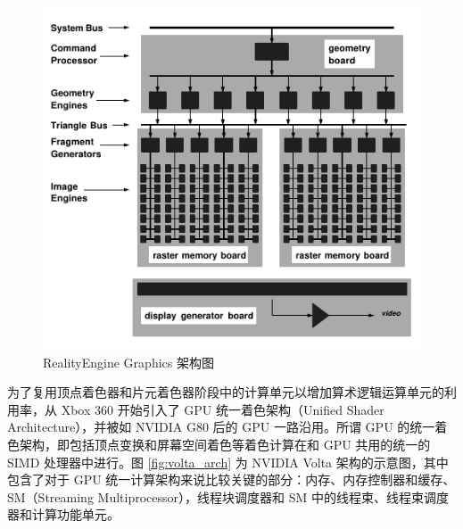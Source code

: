 \begin{figure}
    \centering
    \includegraphics[width=1.0\linewidth]{figures/RealityGraphics-Page2-Crop.pdf}
    \caption{RealityEngine Graphics 架构图\cite{RealityEngineSGI}}
    \label{fig:reality_engine_graphics}
\end{figure}

为了复用顶点着色器和片元着色器阶段中的计算单元以增加算术逻辑运算单元的利用率，从 Xbox 360 \cite{1624324}开始引入了 GPU 统一着色架构（Unified Shader Architecture），并被如 NVIDIA G80 \cite{4523358}后的 GPU 一路沿用。所谓 GPU 的统一着色架构，即包括顶点变换和屏幕空间着色等着色计算在和 GPU 共用的统一的 SIMD 处理器中进行。图 \ref{fig:volta_arch} 为 NVIDIA Volta 架构的示意图，其中包含了对于 GPU 统一计算架构来说比较关键的部分：内存、内存控制器和缓存、SM（Streaming Multiprocessor），线程块调度器和 SM 中的线程束、线程束调度器和计算功能单元。

